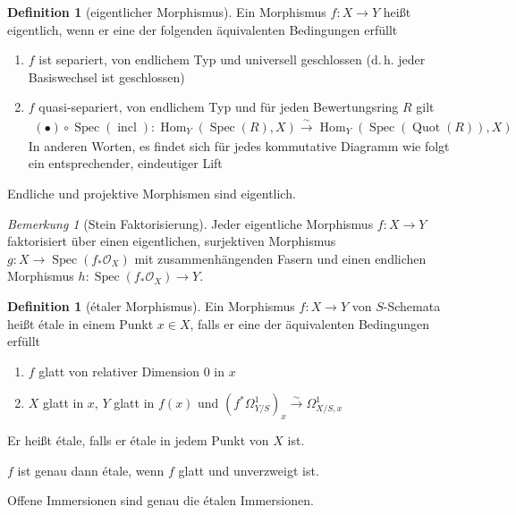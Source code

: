 \documentclass[english, german, parskip=half]{scrreprt}
\theoremstyle{definition}
\newtheorem{Definition}[Satz]{Definition}
\theoremstyle{remark}
\newtheorem{Bemerkung}[Satz]{Bemerkung}
\DeclareMathOperator{\Quot}{Quot} %
\DeclareMathOperator{\Spec}{Spec} %
\renewcommand*{\O}{\mathcal{O}} %
\newcommand*{\Om}[1]{\ensuremath{\Omega_{#1}^1}} %
\newcommand*{\longto}{\longrightarrow}
\DeclareMathOperator{\Hom}{Hom} %
\begin{document}
\begin{Definition}[eigentlicher Morphismus]
  Ein Morphismus $f\colon X\to Y$ heißt eigentlich, wenn er eine der
  folgenden äquivalenten Bedingungen erfüllt
  \begin{enumerate}[label=(\roman*)]
  \item $f$ ist separiert, von endlichem Typ und universell
    geschlossen (d.\,h. jeder Basiswechsel ist geschlossen)
  \item $f$ quasi-separiert, von endlichem Typ und für jeden
    Bewertungsring $R$ gilt
    \begin{gather*}
      (\bullet)\circ\Spec(\operatorname{incl})\colon
      \Hom_Y\left(\Spec(R), X\right) \overset{\sim}{\longto} 
      \Hom_Y\left(\Spec\left(\Quot(R)\right), X\right)
    \end{gather*}
    In anderen Worten, es findet sich für jedes kommutative Diagramm
    wie folgt ein entsprechender, eindeutiger Lift
    \begin{center}
    \end{center}
    
  \end{enumerate}
  Endliche und projektive Morphismen sind eigentlich.
  \cite[siehe][9.5, Remark 5 und Theorem 9]{bosch}

  \begin{Bemerkung}[Stein Faktorisierung]
    Jeder eigentliche Morphismus $f\colon X\to Y$ faktorisiert über
    einen eigentlichen, surjektiven Morphismus $g\colon X\to
    \Spec(f_*\O_X)$ mit zusammenhängenden Fasern und einen endlichen
    Morphismus $h\colon \Spec(f_*\O_X)\to Y$.
    \cite[siehe][9.5, Theorem 12]{bosch}
  \end{Bemerkung}
\end{Definition}

\begin{Definition}[étaler Morphismus]%
  Ein Morphismus $f\colon X\to Y$ von $S$-Schemata heißt étale in
  einem Punkt $x\in X$, falls er eine der äquivalenten Bedingungen
  erfüllt 
  \begin{enumerate}[label=(\roman*)]
  \item $f$ glatt von relativer Dimension 0 in $x$
  \item $X$ glatt in $x$, $Y$ glatt in $f(x)$ und 
    $(f^*\Om{Y/S})_x \overset{\sim}{\longto} \Om{X/S,x}$
  \end{enumerate}
  Er heißt étale, falls er étale in jedem Punkt von $X$ ist.
  \cite[siehe][8.5, Definition 1 und Corollary 12]{bosch}  

  $f$ ist genau dann étale, wenn $f$ glatt und unverzweigt ist.
  \cite[siehe][8.5, Proposition 6]{bosch}

  Offene Immersionen sind genau die étalen Immersionen.
  \cite[siehe][8.5, Lemma 7]{bosch}
\end{Definition}
\end{document}

